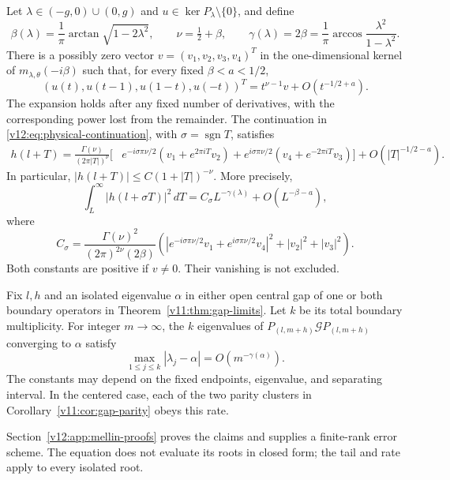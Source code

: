 \begin{theorem}
\label{v12:thm:boundary-tail}
Let $\lambda\in(-g,0)\cup(0,g)$ and
$u\in\ker P_\lambda\setminus\{0\}$, and define
\begin{equation}\label{v12:eq:gap-exponent}
 \beta(\lambda)=\frac1\pi\arctan\sqrt{1-2\lambda^2},\qquad
 \nu=\tfrac12+\beta,\qquad
 \gamma(\lambda)=2\beta
 =\frac1\pi\arccos\frac{\lambda^2}{1-\lambda^2}.
\end{equation}
There is a possibly zero vector $v=(v_1,v_2,v_3,v_4)^T$ in the
one-dimensional kernel of $m_{\lambda,\theta}(-i\beta)$ such that, for
every fixed $\beta<a<1/2$,
\begin{equation}\label{v12:eq:endpoint-expansion}
 (u(t),u(t-1),u(1-t),u(-t))^T
       =t^{\nu-1}v+O(t^{-1/2+a}).
\end{equation}
The expansion holds after any fixed number of derivatives, with the
corresponding power lost from the remainder.  The continuation in
\eqref{v12:eq:physical-continuation}, with $\sigma=\operatorname{sgn}T$,
satisfies
\begin{align}
 h(l+T)=\frac{\Gamma(\nu)}{(2\pi|T|)^\nu}
 \big[&e^{-i\sigma\pi\nu/2}(v_1+e^{2\pi iT}v_2)
       +e^{i\sigma\pi\nu/2}(v_4+e^{-2\pi iT}v_3)\big]
       +O(|T|^{-1/2-a}).
 \label{v12:eq:physical-tail}
\end{align}
In particular, $|h(l+T)|\le C(1+|T|)^{-\nu}$.  More precisely,
\begin{equation}\label{v12:eq:tail-mass}
 \int_L^\infty|h(l+\sigma T)|^2\,dT
   =C_\sigma L^{-\gamma(\lambda)}+O(L^{-\beta-a}),
\end{equation}
where
\[
 C_\sigma=\frac{\Gamma(\nu)^2}{(2\pi)^{2\nu}(2\beta)}
 \left(|e^{-i\sigma\pi\nu/2}v_1+e^{i\sigma\pi\nu/2}v_4|^2
                            +|v_2|^2+|v_3|^2\right).
\]
Both constants are positive if $v\ne0$.  Their vanishing is not excluded.
\end{theorem}

\begin{corollary}
\label{v12:cor:gap-cluster-rate}
Fix $l,h$ and an isolated eigenvalue $\alpha$ in either open central gap
of one or both boundary operators in Theorem~\ref{v11:thm:gap-limits}.
Let $k$ be its total boundary multiplicity.  For integer $m\to\infty$,
the $k$ eigenvalues of $P_{(l,m+h)}\mathcal G P_{(l,m+h)}$ converging
to $\alpha$ satisfy
\[
 \max_{1\le j\le k}|\lambda_j-\alpha|
       =O(m^{-\gamma(\alpha)}).
\]
The constants may depend on the fixed endpoints, eigenvalue, and
separating interval.  In the centered case, each of the two parity
clusters in Corollary~\ref{v11:cor:gap-parity} obeys this rate.
\end{corollary}

Section~\ref{v12:app:mellin-proofs} proves the claims and supplies a
finite-rank error scheme. The equation does not evaluate its roots in
closed form; the tail and rate apply to every isolated root.
